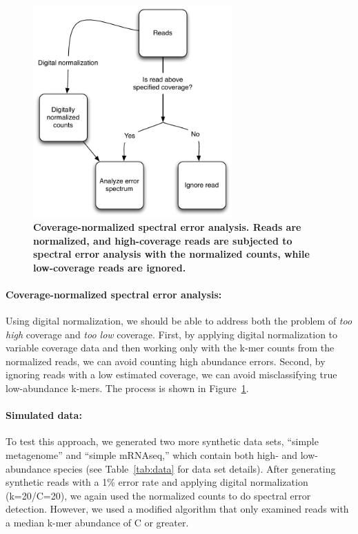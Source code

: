 \documentclass{article}
\begin{document}
\begin{figure}[!ht]
 \centerline{\includegraphics[width=3in]{./figures/coverage-aware-spectrum}}
\caption{{\bf Coverage-normalized spectral error analysis.  Reads are
    normalized, and high-coverage reads are subjected to spectral
    error analysis with the normalized counts, while low-coverage
    reads are ignored.}}
\label{fig:covaware}
\end{figure}

\paragraph{Coverage-normalized spectral error analysis:}

Using digital normalization, we should be able to address both the
problem of {\em too high} coverage and {\em too low} coverage.
First, by applying digital normalization to variable
coverage data and then working only with the k-mer counts from the
normalized reads, we can avoid counting high abundance errors.
Second, by ignoring reads with a low estimated coverage, we can
avoid misclassifying true low-abundance k-mers.  The process
is shown in  Figure~\ref{fig:covaware}.


\paragraph{Simulated data:}
To test this approach, we generated two more synthetic data sets,
``simple metagenome'' and ``simple mRNAseq,'' which contain both high-
and low-abundance species (see Table~\ref{tab:data} for data set
details).  After generating synthetic reads with a 1\% error rate and
applying digital normalization (k=20/C=20), we again used the normalized
counts to do spectral error detection.  However, we used a modified
algorithm that only examined reads with a median k-mer abundance of C
or greater.
\end{document}
